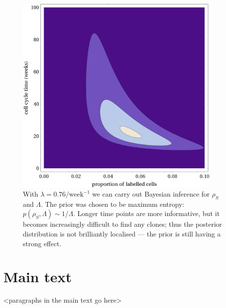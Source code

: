 \documentclass[10pt,UKenglish]{article}
\begin{document}
\begin{figure}[htb]
	\centering
	\includegraphics[width=4in]{single-cell-inference.png}
	\caption{\label{fig:single-cell-inference}With
	$\lambda=0.76/\textrm{week}^{-1}$ we can carry out Bayesian inference
	for $\rho_S$ and $\Lambda$. The prior was chosen to be maximum entropy:
	$p(\rho_S, \Lambda) \sim 1/\Lambda$. Longer time points are more
	informative, but it becomes increasingly difficult to find any clones;
	thus the posterior distribution is not brilliantly localised --- the
	prior is still having a strong effect.}
\end{figure}

\section{Main text}

<paragraphs in the main text go here>
\end{document}
